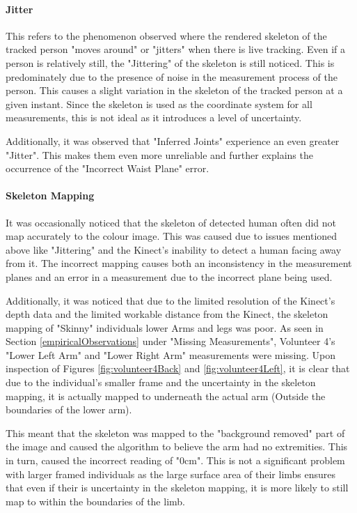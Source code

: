 \paragraph{Jitter}
This refers to the phenomenon observed where the rendered skeleton of the tracked person "moves around" or "jitters" when there is live tracking. Even if a person is relatively still, the "Jittering" of the skeleton is still noticed. This is predominately due to the presence of noise in the measurement process of the person. This causes a slight variation in the skeleton of the tracked person at a given instant. Since the skeleton is used as the coordinate system for all measurements, this is not ideal as it introduces a level of uncertainty.  

Additionally, it was observed that "Inferred Joints" experience an even greater "Jitter". This makes them even more unreliable and further explains the occurrence of the "Incorrect Waist Plane" error. 

\paragraph{Skeleton Mapping}
It was occasionally noticed that the skeleton of detected human often did not map accurately to the colour image. This was caused due to issues mentioned above like "Jittering" and the Kinect's inability to detect a human facing away from it. 
The incorrect mapping causes both an inconsistency in the measurement planes and an error in a measurement due to the incorrect plane being used. 

Additionally, it was noticed that due to the limited resolution of the Kinect's depth data and the limited workable distance from the Kinect, the skeleton mapping of "Skinny" individuals lower Arms and legs was poor. As seen in Section \ref{empiricalObservations} under "Missing Measurements", Volunteer 4's "Lower Left Arm" and "Lower Right Arm" measurements were missing. Upon inspection of Figures \ref{fig:volunteer4Back} and \ref{fig:volunteer4Left}, it is clear that due to the individual's smaller frame and the uncertainty in the skeleton mapping, it is actually mapped to underneath the actual arm (Outside the boundaries of the lower arm). 

This meant that the skeleton was mapped to the "background removed" part of the image and caused the algorithm to believe the arm had no extremities. This in turn, caused the incorrect reading of "0cm". This is not a significant problem with larger framed individuals as the large surface area of their limbs ensures that even if their is uncertainty in the skeleton mapping, it is more likely to still map to within the boundaries of the limb. 


